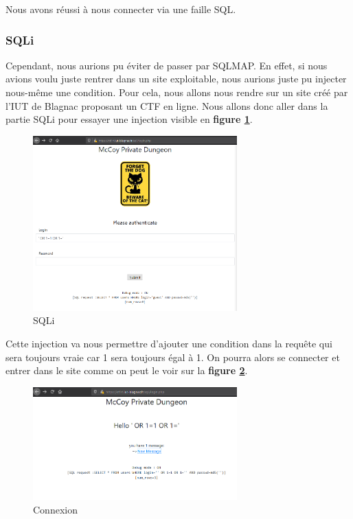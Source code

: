 Nous avons réussi à nous connecter via une faille SQL.

\subsubsection{SQLi}
Cependant, nous aurions pu éviter de passer par SQLMAP. En effet, si nous avions voulu juste rentrer dans un site exploitable, nous aurions juste pu injecter nous-même une condition. Pour cela, nous allons nous rendre sur un site créé par l’IUT de Blagnac proposant un CTF en ligne. Nous allons donc aller dans la partie SQLi pour essayer une injection visible en \textbf{figure \ref{fig:sqli}}.

\begin{figure}[htp!]
  \centering
  \setlength\figureheight{7cm}
  \setlength\figurewidth{9cm}
  \includegraphics[width=0.7\textwidth]{oui/Ancien/imangeancien/SQLi/12.PNG}
  \caption{SQLi}
  \label{fig:sqli}
\end{figure}

Cette injection va nous permettre d’ajouter une condition dans la requête qui sera toujours vraie car 1 sera toujours égal à 1. On pourra alors se connecter et entrer dans le site comme on peut le voir sur la \textbf{figure \ref{fig:sqlicon}}.

\begin{figure}[htp!]
  \centering
  \setlength\figureheight{7cm}
  \setlength\figurewidth{9cm}
  \includegraphics[width=0.7\textwidth]{oui/Ancien/imangeancien/SQLi/13.PNG}
  \caption{Connexion}
  \label{fig:sqlicon}
\end{figure}

